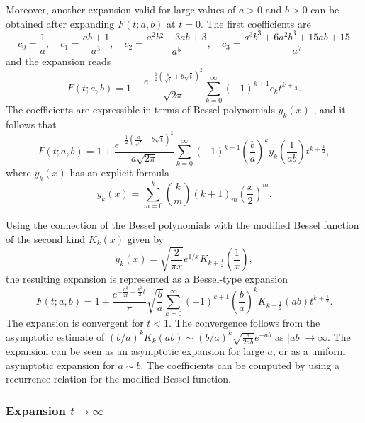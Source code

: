 \documentclass[10pt,a4paper,oneside]{article}
\numberwithin{equation}{section}
\begin{document}
Moreover, another expansion valid for large values of $a > 0$ and $b > 0$ can be obtained after expanding $F(t;a,b)$ at $t=0$. The first coefficients are
\begin{equation}
c_0 = \frac{1}{a}, \quad c_1 = \frac{ab + 1}{a^3}, \quad c_2 = \frac{a^2b² +3ab + 3}{a^5}, \quad c_3 = \frac{a^3b^3 + 6a^2b^3 + 15ab + 15}{a^7}
\end{equation}
and the expansion reads
\begin{equation}
F(t; a, b) = 1 + \frac{e^{-\frac{1}{2} \left(\frac{a}{\sqrt{t}} + b\sqrt{t} \right)^2}}{\sqrt{2\pi}}\sum_{k=0}^{\infty}(-1)^{k+1}c_k t^{k + \frac{1}{2}}.
\end{equation}
The coefficients are expressible in terms of Bessel polynomials $y_k(x)$ \cite[\S A001498]{OEIS}, and it follows that
\begin{equation}
F(t; a, b) = 1 + \frac{e^{-\frac{1}{2} \left(\frac{a}{\sqrt{t}} + b\sqrt{t} \right)^2}}{a\sqrt{2\pi}}\sum_{k=0}^{\infty}(-1)^{k+1} \left(\frac{b}{a}\right)^k y_k\left(\frac{1}{ab}\right) t^{k + \frac{1}{2}},
\end{equation}
where $y_k(x)$ has an explicit formula
\begin{equation}
y_k(x) = \sum_{m=0}^k \binom{k}{m} (k + 1)_m \left(\frac{x}{2}\right)^m.
\end{equation}

Using the connection of the Bessel polynomials with the modified Bessel function of the second kind $K_k(x)$ given by \cite[\S 33.1.3]{Temme2015}
\begin{equation}
y_k(x) = \sqrt{\frac{2}{\pi x}}e^{1/x} K_{k + \frac{1}{2}}\left(\frac{1}{x}\right),
\end{equation}
the resulting expansion is represented as a Bessel-type expansion
\begin{equation}\label{phi_expansion_besselk}
F(t; a, b) = 1 + \frac{e^{-\frac{a^2}{2t} - \frac{b^2}{2}t}}{\pi}\sqrt{\frac{b}{a}}\sum_{k=0}^{\infty} (-1)^{k+1} \left(\frac{b}{a}\right)^k K_{k + \frac{1}{2}}(ab)t^{k + \frac{1}{2}}.
\end{equation}
The expansion is convergent for $t < 1$. The convergence follows from the asymptotic estimate of $(b/a)^k K_k(ab) \sim (b/a)^k \sqrt{\frac{\pi}{2ab}}e^{-ab}$ as $|ab| \to \infty$. The expansion can be seen as an asymptotic expansion for large $a$, or as a uniform asymptotic expansion for $a \sim b$. The coefficients can be computed by using a recurrence relation for the modified Bessel function.

\subsubsection{Expansion $t \to \infty$}
\end{document}
